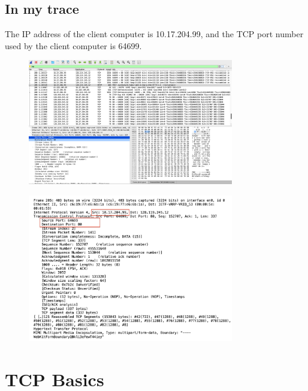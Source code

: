\documentclass{article}
\begin{document}
\begin{CJK*}{UTF8}{gbsn}
\subsection{In my trace}
The IP address of the client computer is 10.17.204.99,
and the TCP port number used by the client computer is 64699.
\begin{figure}[H]
    \centering
    \includegraphics[width=0.8\textwidth]{2-1.png}
\end{figure}
\begin{figure}[H]
    \centering
    \includegraphics[width=0.8\textwidth]{2-2.png}
\end{figure}

\section{TCP Basics}

\end{CJK*}
\end{document}
